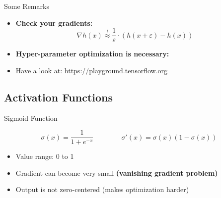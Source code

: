 \begin{frame}{Some Remarks}{}
	\begin{itemize}
		\item \textbf{Check your gradients:}
		\begin{equation*}
			\nabla h(x) \overset{!}{\approx} \frac{1}{\varepsilon} \cdot (h(x + \varepsilon) - h(x))
		\end{equation*}
		\item \textbf{Hyper-parameter optimization is necessary:}
	\end{itemize}
	\begin{itemize}
		\item Have a look at: \url{https://playground.tensorflow.org}
	\end{itemize}
\end{frame}


\subsection{Activation Functions}

\begin{frame}{Sigmoid Function}{}
	\begin{boxBlueNoFrame}
		\begin{equation*}
			\sigma(x) = \frac{1}{1 + e^{-x}} \qquad\qquad
			\sigma'(x) = \sigma(x) (1 - \sigma(x))
		\end{equation*}
	\end{boxBlueNoFrame}

	\begin{itemize}
		\item Value range: 0 to 1
		\item {} Gradient can become very small \textbf{(vanishing gradient problem)}
		\item {} Output is not zero-centered (makes optimization harder)
	\end{itemize}
\end{frame}


